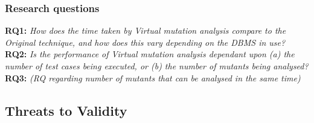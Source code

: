 \subsubsection{Research questions}

\textbf{RQ1: }\emph{How does the time taken by Virtual mutation analysis compare to the Original technique, and how does this vary depending on the DBMS in use?}\\


\textbf{RQ2: }\emph{Is the performance of Virtual mutation analysis dependant upon (a) the number of test cases being executed, or (b) the number of mutants being analysed?}\\


\textbf{RQ3: }\emph{(RQ regarding number of mutants that can be analysed in the same time)}\\




\subsection{Threats to Validity}
